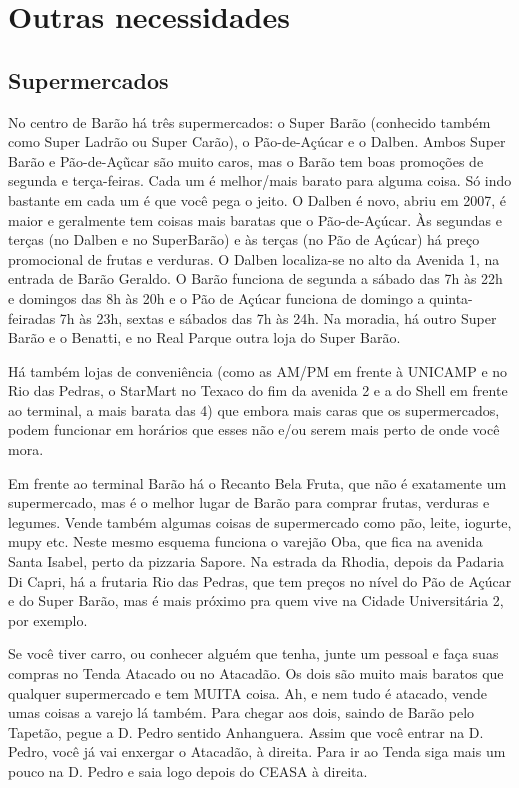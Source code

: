 
\section{Outras necessidades}
\subsection{Supermercados}

No centro de Barão há três supermercados: o Super Barão (conhecido também como
Super Ladrão ou Super Carão), o Pão-de-Açúcar e o Dalben. Ambos Super Barão
e Pão-de-Açũcar são muito caros, mas o Barão tem boas promoções de segunda
e terça-feiras. Cada um é melhor/mais barato para alguma coisa. Só indo bastante
em cada um é que você pega o jeito. O Dalben é novo, abriu em 2007, é maior
e geralmente tem coisas mais baratas que o Pão-de-Açúcar. Às segundas e terças
(no Dalben e no SuperBarão) e às terças (no Pão de Açúcar) há preço promocional
de frutas e verduras. O Dalben localiza-se no alto da Avenida 1, na entrada de
Barão Geraldo. O Barão funciona de segunda a sábado das 7h às 22h e domingos das
8h às 20h e o Pão de Açúcar funciona de domingo a quinta-feiradas 7h às 23h,
sextas e sábados das 7h às 24h. Na moradia, há outro Super Barão e o Benatti,
e no Real Parque outra loja do Super Barão.

Há também lojas de conveniência (como as AM/PM em frente à UNICAMP e no Rio das
Pedras, o StarMart no Texaco do fim da avenida 2 e a do Shell em frente ao
terminal, a mais barata das 4) que embora mais caras que os supermercados, podem
funcionar em horários que esses não e/ou serem mais perto de onde você mora.

Em frente ao terminal Barão há o Recanto Bela Fruta, que não é exatamente um
supermercado, mas é o melhor lugar de Barão para comprar frutas, verduras
e legumes. Vende também algumas coisas de supermercado como pão, leite, iogurte,
mupy etc. Neste mesmo esquema funciona o varejão Oba, que fica na avenida Santa
Isabel, perto da pizzaria Sapore. Na estrada da Rhodia, depois da Padaria Di
Capri, há a frutaria Rio das Pedras, que tem preços no nível do Pão de Açúcar
e do Super Barão, mas é mais próximo pra quem vive na Cidade Universitária 2,
por exemplo.

Se você tiver carro, ou conhecer alguém que tenha, junte um pessoal e faça suas
compras no Tenda Atacado ou no Atacadão. Os dois são muito mais baratos que
qualquer supermercado e tem MUITA coisa. Ah, e nem tudo é atacado, vende umas
coisas a varejo lá também. Para chegar aos dois, saindo de Barão pelo Tapetão,
pegue a D. Pedro sentido Anhanguera. Assim que você entrar na D. Pedro, você já
vai enxergar o Atacadão, à direita. Para ir ao Tenda siga mais um pouco na D.
Pedro e saia logo depois do CEASA à direita.

